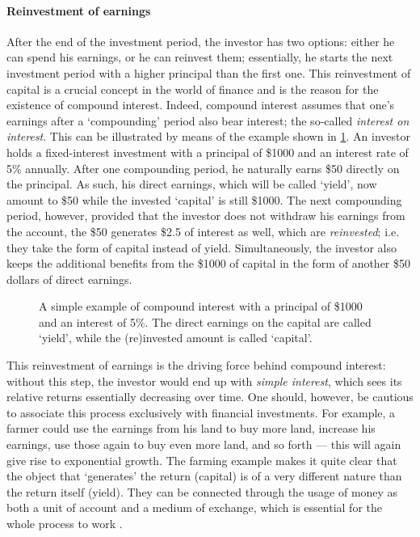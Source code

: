 \paragraph{Reinvestment of earnings}
After the end of the investment period, the investor has two options: either he can spend his earnings, or he can reinvest them; essentially, he starts the next investment period with a higher principal than the first one. This reinvestment of capital is a crucial concept in the world of finance and is the reason for the existence of compound interest. Indeed, compound interest assumes that one's earnings after a `compounding' period also bear interest; the so-called \emph{interest on interest}. This can be illustrated by means of the example shown in \cref{fig:compound_interest}. An investor holds a fixed-interest investment with a principal of \$1000 and an interest rate of 5\% annually. After one compounding period, he naturally earns \$50 directly on the principal. As such, his direct earnings, which will be called `yield', now amount to \$50 while the invested `capital' is still \$1000. The next compounding period, however, provided that the investor does not withdraw his earnings from the account, the \$50 generates \$2.5 of interest as well, which are \emph{reinvested}; i.e. they take the form of capital instead of yield. Simultaneously, the investor also keeps the additional benefits from the \$1000 of capital in the form of another \$50 dollars of direct earnings.
\begin{figure}[h]
    \centering
    
    \caption{A simple example of compound interest with a principal of \$1000 and an interest of 5\%. The direct earnings on the capital are called `yield', while the (re)invested amount is called `capital'.}
    \label{fig:compound_interest}
\end{figure}

This reinvestment of earnings is the driving force behind compound interest: without this step, the investor would end up with \emph{simple interest}, which sees its relative returns essentially decreasing over time. One should, however, be cautious to associate this process exclusively with financial investments. For example, a farmer could use the earnings from his land to buy more land, increase his earnings, use those again to buy even more land, and so forth --- this will again give rise to exponential growth. The farming example makes it quite clear that the object that `generates' the return (capital) is of a very different nature than the return itself (yield). They can be connected through the usage of money as both a unit of account and a medium of exchange, which is essential for the whole process to work \cite{Mankiw2017}. 

